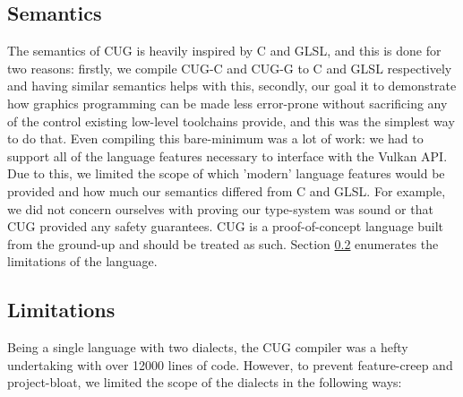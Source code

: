 \documentclass[a4paper,12pt,twoside,openright]{report}
\def\compilerloccount{12000 }
\begin{document}
\subsection{Semantics}

The semantics of CUG is heavily inspired by C and GLSL, and this is done for
two reasons: firstly, we compile CUG-C and CUG-G to C and GLSL respectively and
having similar semantics helps with this, secondly, our goal it to demonstrate
how graphics programming can be made less error-prone without sacrificing any
of the control existing low-level toolchains provide, and this was the simplest
way to do that. Even compiling this bare-minimum was a lot of work: we had to
support all of the language features necessary to interface with the Vulkan
API. Due to this, we limited the scope of which 'modern' language features
would be provided and how much our semantics differed from C and GLSL. For
example, we did not concern ourselves with proving our type-system was sound or
that CUG provided any safety guarantees. CUG is a proof-of-concept language
built from the ground-up and should be treated as such. Section
\ref{subsec:limitations} enumerates the limitations of the language.

\subsection{Limitations}

\label{subsec:limitations}

Being a single language with two dialects, the CUG compiler was a hefty
undertaking with over \compilerloccount lines of code. However, to prevent
feature-creep and project-bloat, we limited the scope of the dialects in the
following ways:
\end{document}
